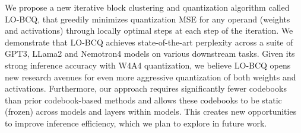 
We propose a new iterative block clustering and quantization algorithm called LO-BCQ, that greedily minimizes quantization MSE for any operand (weights and activations) through locally optimal steps at each step of the iteration. We demonstrate that LO-BCQ achieves state-of-the-art perplexity across a suite of GPT3, LLama2 and Nemotron4 models on various downstream tasks. Given its strong inference accuracy with W4A4 quantization, we believe LO-BCQ opens new research avenues for even more aggressive quantization of both weights and activations. Furthermore, our approach requires significantly fewer codebooks than prior codebook-based methods and allows these codebooks to be static (frozen) across models and layers within models. This creates new opportunities to improve inference efficiency, which we plan to explore in future work.